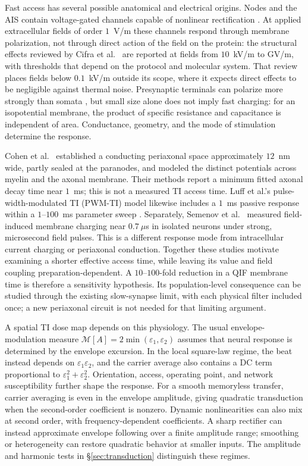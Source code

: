\documentclass[11pt,a4paper]{article}
\begin{document}
Fast access has several possible anatomical and electrical origins. Nodes and the
AIS contain voltage-gated channels capable of nonlinear rectification
\cite{mirzakhalili2020,wang2023}. At applied extracellular fields of order $1$~V/m these
channels respond through membrane polarization, not through direct action of the
field on the protein: the structural effects reviewed by Cifra et al.\
\cite{cifra2026} are reported at fields from $10$~kV/m to GV/m, with thresholds
that depend on the protocol and molecular system. That review places
fields below $0.1$~kV/m outside its scope, where it expects direct effects to be
negligible against thermal noise. Presynaptic terminals can polarize more strongly
than somata \cite{rahman2013,aberra2023,chakraborty2018}, but small size alone does
not imply fast charging: for an isopotential membrane, the product of specific
resistance and capacitance is independent of area. Conductance, geometry, and the
mode of stimulation determine the response.

Cohen et al.\ \cite{cohen2020periaxonal} established a conducting periaxonal space
approximately $12$~nm wide, partly sealed at the paranodes, and modeled the distinct
potentials across myelin and the axonal membrane. Their methods report a minimum
fitted axonal decay time near $1$~ms; this is not a measured TI access time.
Luff et al.'s pulse-width-modulated TI (PWM-TI) model likewise includes a $1$~ms passive response within a
$1$--$100$~ms parameter sweep \cite{luff2024}. Separately, Semenov et al.\
\cite{semenov2025} measured field-induced membrane charging near $0.7~\mu$s in
isolated neurons under strong, microsecond field pulses. This is a different
response mode from intracellular current charging or periaxonal conduction.
Together these studies motivate examining a shorter effective access time, while
leaving its value and field coupling preparation-dependent. A $10$--$100$-fold
reduction in a QIF membrane time is therefore a sensitivity hypothesis. Its
population-level consequence can be studied through the existing slow-synapse
limit, with each physical filter included once; a new periaxonal circuit is not
needed for that limiting argument.

A spatial TI dose map depends on this physiology. The usual envelope-modulation
measure $\mathcal M[A]=2\min(\varepsilon_1,\varepsilon_2)$ assumes that neural
response is determined by the envelope excursion. In the local square-law regime,
the beat instead depends on $\varepsilon_1\varepsilon_2$, and the carrier average
also contains a DC term proportional to $\varepsilon_1^2+\varepsilon_2^2$.
Orientation, access, operating point, and network susceptibility further shape
the response. For a smooth memoryless transfer, carrier averaging is even in the
envelope amplitude, giving quadratic transduction when the second-order coefficient
is nonzero. Dynamic nonlinearities can also mix at second order, with
frequency-dependent coefficients. A sharp rectifier can instead approximate
envelope following over a finite amplitude range; smoothing or heterogeneity
can restore quadratic behavior at smaller inputs. The amplitude and harmonic
tests in \S\ref{sec:transduction} distinguish these regimes.
\end{document}
